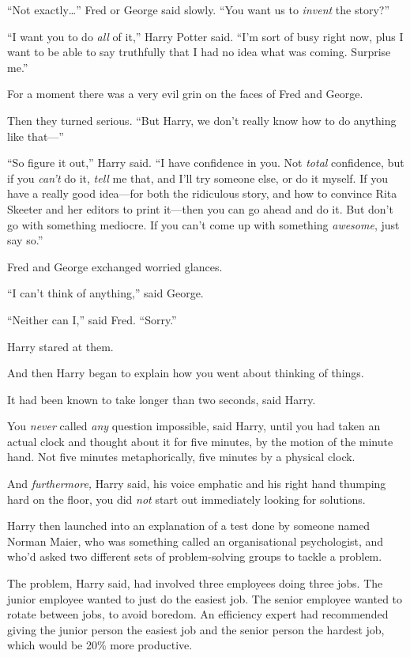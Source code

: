 ``Not exactly\ldots{}'' Fred or George said slowly. ``You want us to
\emph{invent} the story?''

``I want you to do \emph{all} of it,'' Harry Potter said. ``I'm sort of
busy right now, plus I want to be able to say truthfully that I had no
idea what was coming. Surprise me.''

For a moment there was a very evil grin on the faces of Fred and George.

Then they turned serious. ``But Harry, we don't really know how to do
anything like that---''

``So figure it out,'' Harry said. ``I have confidence in you. Not
\emph{total} confidence, but if you \emph{can't} do it, \emph{tell} me
that, and I'll try someone else, or do it myself. If you have a really
good idea---for both the ridiculous story, and how to convince Rita
Skeeter and her editors to print it---then you can go ahead and do it.
But don't go with something mediocre. If you can't come up with
something \emph{awesome}, just say so.''

Fred and George exchanged worried glances.

``I can't think of anything,'' said George.

``Neither can I,'' said Fred. ``Sorry.''

Harry stared at them.

And then Harry began to explain how you went about thinking of things.

It had been known to take longer than two seconds, said Harry.

You \emph{never} called \emph{any} question impossible, said Harry,
until you had taken an actual clock and thought about it for five
minutes, by the motion of the minute hand. Not five minutes
metaphorically, five minutes by a physical clock.

And \emph{furthermore,} Harry said, his voice emphatic and his right
hand thumping hard on the floor, you did \emph{not} start out
immediately looking for solutions.

Harry then launched into an explanation of a test done by someone named
Norman Maier, who was something called an organisational psychologist,
and who'd asked two different sets of problem-solving groups to tackle a
problem.

The problem, Harry said, had involved three employees doing three jobs.
The junior employee wanted to just do the easiest job. The senior
employee wanted to rotate between jobs, to avoid boredom. An efficiency
expert had recommended giving the junior person the easiest job and the
senior person the hardest job, which would be 20\% more productive.

